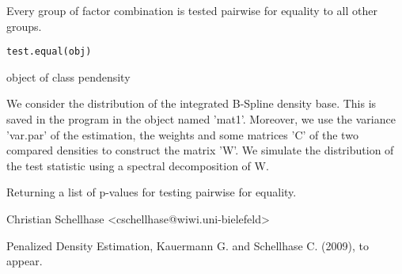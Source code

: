 \begin{Description}\relax
Every group of factor combination is tested pairwise for equality to all other groups.
\end{Description}
\begin{Usage}
\begin{verbatim}
test.equal(obj)
\end{verbatim}
\end{Usage}
\begin{Arguments}
\begin{ldescription}
\item[\code{obj}] object of class pendensity
\end{ldescription}
\end{Arguments}
\begin{Details}\relax
We consider the distribution of the integrated B-Spline density base. This is saved in the program in the object named 'mat1'. Moreover, we use the variance 'var.par' of the estimation, the weights and some matrices 'C' of the two compared densities to construct the matrix 'W'. We simulate the distribution of the test statistic using a spectral decomposition of W.
\end{Details}
\begin{Value}
Returning a list of p-values for testing pairwise for equality.
\end{Value}
\begin{Author}\relax
Christian Schellhase <cschellhase@wiwi.uni-bielefeld>
\end{Author}
\begin{References}\relax
Penalized Density Estimation, Kauermann G. and Schellhase C. (2009), to appear.
\end{References}

